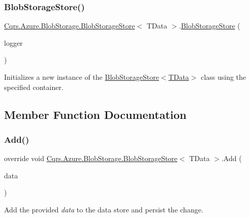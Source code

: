 \subsubsection{\texorpdfstring{Blob\+Storage\+Store()}{BlobStorageStore()}}
{\footnotesize\ttfamily \hyperlink{classCqrs_1_1Azure_1_1BlobStorage_1_1BlobStorageStore}{Cqrs.\+Azure.\+Blob\+Storage.\+Blob\+Storage\+Store}$<$ T\+Data $>$.\hyperlink{classCqrs_1_1Azure_1_1BlobStorage_1_1BlobStorageStore}{Blob\+Storage\+Store} (\begin{DoxyParamCaption}\item[{I\+Logger}]{logger }\end{DoxyParamCaption})}



Initializes a new instance of the \hyperlink{classCqrs_1_1Azure_1_1BlobStorage_1_1BlobStorageStore_ae1979c63b97dea8e207dda7b0087ee6b_ae1979c63b97dea8e207dda7b0087ee6b}{Blob\+Storage\+Store$<$\+T\+Data$>$} class using the specified container. 



\subsection{Member Function Documentation}
\mbox{\label{classCqrs_1_1Azure_1_1BlobStorage_1_1BlobStorageStore_a527ef0e0d39f9e01f4112b6bc90129b2_a527ef0e0d39f9e01f4112b6bc90129b2}} 
\subsubsection{\texorpdfstring{Add()}{Add()}}
{\footnotesize\ttfamily override void \hyperlink{classCqrs_1_1Azure_1_1BlobStorage_1_1BlobStorageStore}{Cqrs.\+Azure.\+Blob\+Storage.\+Blob\+Storage\+Store}$<$ T\+Data $>$.Add (\begin{DoxyParamCaption}\item[{T\+Data}]{data }\end{DoxyParamCaption})\hspace{0.3cm}{\ttfamily [virtual]}}



Add the provided {\itshape data}  to the data store and persist the change. 




